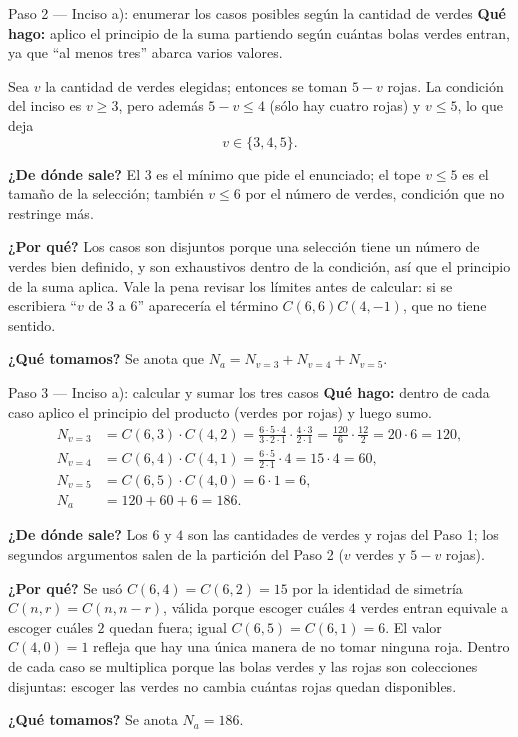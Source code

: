 \documentclass[11pt]{article}
\begin{document}
\begin{paso}{Paso 2 --- Inciso a): enumerar los casos posibles según la cantidad de verdes}
\textbf{Qué hago:} aplico el principio de la suma partiendo según cuántas bolas verdes entran, ya que ``al menos tres'' abarca varios valores.

Sea $v$ la cantidad de verdes elegidas; entonces se toman $5-v$ rojas. La condición del inciso es $v\ge 3$, pero además $5-v\le 4$ (sólo hay cuatro rojas) y $v\le 5$, lo que deja
\[
  v\in\{3,4,5\}.
\]

\textbf{¿De dónde sale?} El $3$ es el mínimo que pide el enunciado; el tope $v\le 5$ es el tamaño de la selección; también $v\le 6$ por el número de verdes, condición que no restringe más.

\textbf{¿Por qué?} Los casos son disjuntos porque una selección tiene un número de verdes bien definido, y son exhaustivos dentro de la condición, así que el principio de la suma aplica. Vale la pena revisar los límites antes de calcular: si se escribiera ``$v$ de $3$ a $6$'' aparecería el término $C(6,6)C(4,-1)$, que no tiene sentido.

\textbf{¿Qué tomamos?} Se anota que $N_a=N_{v=3}+N_{v=4}+N_{v=5}$.
\end{paso}

\begin{paso}{Paso 3 --- Inciso a): calcular y sumar los tres casos}
\textbf{Qué hago:} dentro de cada caso aplico el principio del producto (verdes por rojas) y luego sumo.
\begin{align*}
  N_{v=3}&=C(6,3)\cdot C(4,2)=\frac{6\cdot 5\cdot 4}{3\cdot 2\cdot 1}\cdot\frac{4\cdot 3}{2\cdot 1}=\frac{120}{6}\cdot\frac{12}{2}=20\cdot 6=120,\\
  N_{v=4}&=C(6,4)\cdot C(4,1)=\frac{6\cdot 5}{2\cdot 1}\cdot 4=15\cdot 4=60,\\
  N_{v=5}&=C(6,5)\cdot C(4,0)=6\cdot 1=6,\\
  N_a&=120+60+6=186 .
\end{align*}

\textbf{¿De dónde sale?} Los $6$ y $4$ son las cantidades de verdes y rojas del Paso 1; los segundos argumentos salen de la partición del Paso 2 ($v$ verdes y $5-v$ rojas).

\textbf{¿Por qué?} Se usó $C(6,4)=C(6,2)=15$ por la identidad de simetría $C(n,r)=C(n,n-r)$, válida porque escoger cuáles $4$ verdes entran equivale a escoger cuáles $2$ quedan fuera; igual $C(6,5)=C(6,1)=6$. El valor $C(4,0)=1$ refleja que hay una única manera de no tomar ninguna roja. Dentro de cada caso se multiplica porque las bolas verdes y las rojas son colecciones disjuntas: escoger las verdes no cambia cuántas rojas quedan disponibles.

\textbf{¿Qué tomamos?} Se anota $N_a=186$.
\end{paso}
\end{document}
